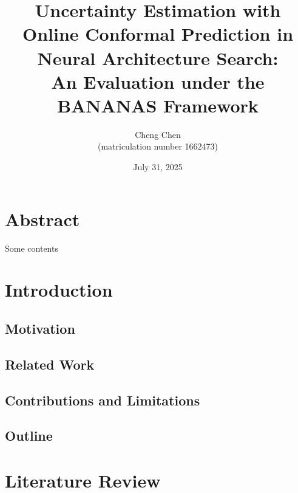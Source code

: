 \documentclass[a4paper,oneside,bibliography=totoc]{scrbook}
\begin{document}
\frontmatter \subject{Master Thesis} %
\title{\LARGE 
	Uncertainty Estimation with Online Conformal Prediction in Neural Architecture Search: \\ 
	An Evaluation under the BANANAS Framework 
}
\author{
	Cheng Chen\\ (matriculation number 1662473)} \date{July 31, 2025
}
\publishers{
	{\small Submitted to}\\
	Data and Web Science Group\\Prof.\ Dr.\ Margret Keuper\\University of Mannheim\\
}
\maketitle

\chapter{Abstract}
Some contents


\begingroup%
\hypersetup{hidelinks} %
\tableofcontents%
\endgroup


\listofalgorithms 
\listoffigures 
\listoftables


\mainmatter  %

\chapter{Introduction}
\label{ch:intro}

\section{Motivation}
\section{Related Work}
\section{Contributions and Limitations}
\section{Outline}


\chapter{Literature Review}
\label{ch:related_work}
\end{document}
